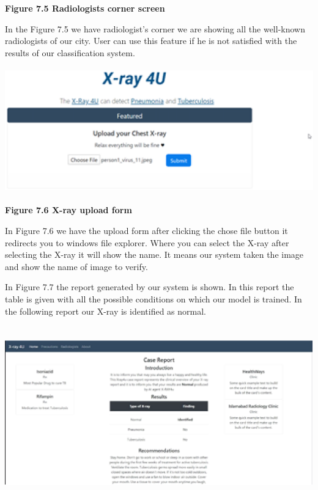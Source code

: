 \documentclass{article} %
\begin{document}
\noindent \textbf{Figure 7.5 Radiologists corner screen}

\noindent In the Figure 7.5 we have radiologist's corner we are showing all the well-known radiologists of our city. User can use this feature if he is not satisfied with the results of our classification system.

\noindent \includegraphics*[width=5.95in, height=2.14in, keepaspectratio=false, trim=0.00in 0.01in 0.30in 0.00in]{image39}

\noindent \textbf{Figure 7.6 X-ray upload form}

\noindent In Figure 7.6 we have the upload form after clicking the chose file button it redirects you to windows file explorer. Where you can select the X-ray after selecting the X-ray it will show the name. It means our system taken the image and show the name of image to verify.

\noindent In Figure 7.7 the report generated by our system is shown. In this report the table is given with all the possible conditions on which our model is trained. In the following report our X-ray is identified as normal.

\noindent 

\noindent \includegraphics*[width=6.25in, height=2.97in, keepaspectratio=false, trim=0.04in 0.00in 0.06in 0.00in]{image40}
\end{document}
